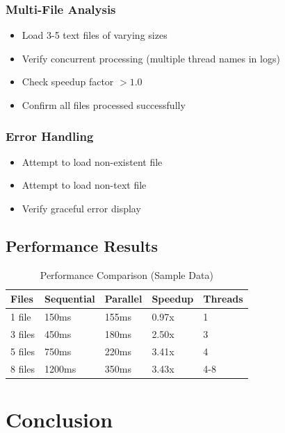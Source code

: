 \documentclass[12pt,a4paper]{report}
\begin{document}
\subsection{Multi-File Analysis}
\begin{itemize}
    \item Load 3-5 text files of varying sizes
    \item Verify concurrent processing (multiple thread names in logs)
    \item Check speedup factor $> 1.0$
    \item Confirm all files processed successfully
\end{itemize}

\subsection{Error Handling}
\begin{itemize}
    \item Attempt to load non-existent file
    \item Attempt to load non-text file
    \item Verify graceful error display
\end{itemize}

\section{Performance Results}
\begin{table}[H]
\centering
\begin{tabularx}{\textwidth}{|l|l|l|l|X|}
\hline
\textbf{Files} & \textbf{Sequential} & \textbf{Parallel} & \textbf{Speedup} & \textbf{Threads} \\
\hline
1 file & 150ms & 155ms & 0.97x & 1 \\
\hline
3 files & 450ms & 180ms & 2.50x & 3 \\
\hline
5 files & 750ms & 220ms & 3.41x & 4 \\
\hline
8 files & 1200ms & 350ms & 3.43x & 4-8 \\
\hline
\end{tabularx}
\caption{Performance Comparison (Sample Data)}
\end{table}

\chapter{Conclusion}
\end{document}
